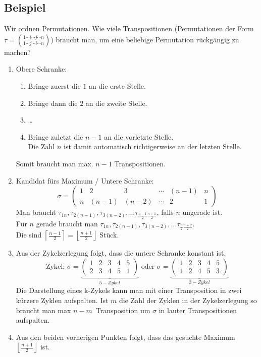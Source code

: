 \subsection{Beispiel}
Wir ordnen Permutationen.
Wie viele Transpositionen (Permutationen der Form $\tau=\binom{1 \cdots i \cdots j \cdots n}{1 \cdots j \cdots i \cdots n}$) braucht man, um eine beliebige Permutation rückgängig zu machen?
\begin{enumerate}
\item Obere Schranke:
	\begin{enumerate}
	\item Bringe zuerst die $1$ an die erste Stelle.
	\item Bringe dann die $2$ an die zweite Stelle.
	\item \dots
	\item Bringe zuletzt die $n-1$ an die vorletzte Stelle. \\
		Die Zahl $n$ ist damit automatisch richtigerweise an der letzten Stelle.
	\end{enumerate}
	Somit braucht man max. $n-1$ Transpositionen.
\item Kandidat fürs Maximum / Untere Schranke:
	\[\sigma = \left( \begin{matrix}
	1 & 2 & 3 & \cdots & (n-1) & n \\ n & (n-1) & (n-2) & \cdots & 2 & 1
	\end{matrix} \right) \]
	Man braucht $\tau_{1n}, \tau_{2(n-1)}, \tau_{3(n-2)}, \ldots \tau_{\frac{n-1}{2} \frac{n+1}{2}}$, falls $n$ ungerade ist. \\
	Für $n$ gerade braucht man $\tau_{1n}, \tau_{2(n-1)}, \tau_{3(n-2)}, \ldots \tau_{\frac{n}{2} \frac{n+2}{2}}$. \\
	Die sind $\left \lceil \frac{n-1}{2} \right \rceil = \left \lfloor \frac{n+1}{2} \right \rfloor $ Stück.
\item Aus der Zykelzerlegung folgt, dass die untere Schranke konstant ist.
	\[\text{Zykel: } \sigma = \underbrace{\left( \begin{matrix}
	1 & 2 & 3 & 4 & 5 \\ 2 & 3 & 4 & 5 & 1
	\end{matrix} \right)}_{5-Zykel} \text{ oder }
	\sigma = \underbrace{\left( \begin{matrix}
	1 & 2 & 3 & 4 & 5 \\ 1 & 2 & 4 & 5 & 3
	\end{matrix} \right)}_{3-Zykel} \]
	Die Darstellung eines k-Zykels kann man mit einer Transposition in zwei kürzere Zyklen aufspalten.
	Ist $m$ die Zahl der Zyklen in der Zykelzerlegung so braucht man max $n-m$ Transposition um $\sigma$ in lauter Transpositionen aufspalten.
\item Aus den beiden vorherigen Punkten folgt, dass das gesuchte Maximum $\left \lfloor \frac{n+1}{2} \right \rfloor$ ist.
\end{enumerate}

